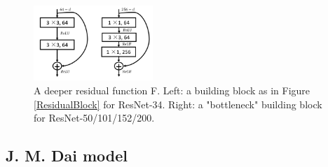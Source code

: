 \documentclass[a4paper,12pt]{report}
\begin{document}
\begin{figure}[H]
    \centering
    \includegraphics[width=0.4\textwidth]{figures/BottleNeckResnet.png}
    \caption{A deeper residual function F. Left: a building block as in Figure \ref{ResidualBlock} for ResNet-34. Right: a "bottleneck" building block for ResNet-50/101/152/200.}
    \label{BottleNeckBlock}
\end{figure}

\newpage
\subsection{J. M. Dai model}
\end{document}
